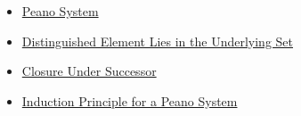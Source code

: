\begin{dependencies}
\begin{itemize}
  \item \hyperref[def:peano-system]{Peano System}
  \item \hyperref[ax:peano-base-in-set]{Distinguished Element Lies in the Underlying Set}
  \item \hyperref[ax:peano-successor-closure]{Closure Under Successor}
  \item \hyperref[thm:induction-principle-for-peano-system]{Induction Principle for a Peano System}
\end{itemize}
\end{dependencies}

